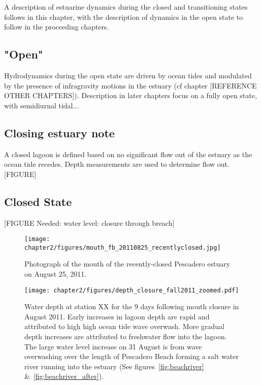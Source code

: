 A description of estuarine dynamics during the closed and transitioning
states follows in this chapter, with the description of dynamics in the
open state to follow in the proceeding chapters.

\subsection{"Open"} \label{opench2}
Hydrodynamics during the open state are driven by ocean tides and modulated by the presence of infragravity motions in the 
estuary (cf chapter [REFERENCE OTHER CHAPTERS]). Description in later chapters focus on a fully open state, with 
semidiurnal tidal...


\subsection{Closing estuary note} \label{closingest} A closed lagoon is
defined based on no significant flow out of the estuary as the ocean
tide recedes. Depth measurements are used to determine flow out.
[FIGURE]

\subsection{Closed State} \label{closed dynamics}


[FIGURE Needed: water level: closure through breach]

\begin{figure}
	\begin{center}
		\texttt{[image: chapter2/figures/mouth\_fb\_20110825\_recentlyclosed.jpg]} \caption{Photograph of the mouth of the recently-closed Pescadero estuary on August 25, 2011.}
	\end{center}
\label{fig:mouth_fb_20110825} \end{figure}


\begin{figure}
	\begin{center}
		\texttt{[image: chapter2/figures/depth\_closure\_fall2011\_zoomed.pdf]} \caption{Water depth at station XX for the 9 days following mouth closure in August 2011. Early increases in lagoon depth are rapid and attributed to high high ocean tide wave overwash. More gradual depth increases are attributed to freshwater flow into the lagoon. The large water level increase on 31 August is from wave overwashing over the length of Pescadero Beach forming a salt water river running into the estuary (See figures~\ref{fig:beachriver} \&~\ref{fig:beachriver_after}).}
	\end{center}
\label{fig:depthclosuref11} \end{figure}


